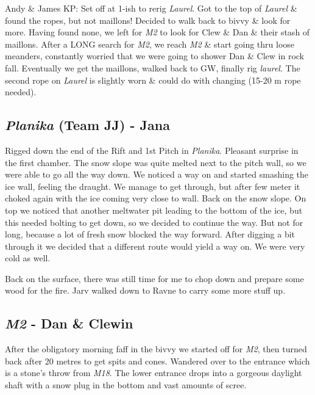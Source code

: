 Andy \& James KP: Set off at 1-ish to rerig \emph{Laurel}. Got to the
top of \emph{Laurel} \& found the ropes, but not maillons! Decided to
walk back to bivvy \& look for more. Having found none, we left for
\emph{M2} to look for Clew \& Dan \& their stash of maillons. After a
LONG search for \emph{M2}, we reach \emph{M2} \& start going thru loose
meanders, constantly worried that we were going to shower Dan \& Clew in
rock fall. Eventually we get the maillons, walked back to GW, finally
rig \emph{laurel}. The second rope on \emph{Laurel} is slightly worn \&
could do with changing (15-20 m rope needed).

\hypertarget{planika-team-jj---jana}{%
\subsection{\texorpdfstring{\emph{Planika} (Team JJ) -
Jana}{Planika (Team JJ) - Jana}}\label{planika-team-jj---jana}}

Rigged down the end of the Rift and 1st Pitch in \emph{Planika}.
Pleasant surprise in the first chamber. The snow slope was quite melted
next to the pitch wall, so we were able to go all the way down. We
noticed a way on and started smashing the ice wall, feeling the draught.
We manage to get through, but after few meter it choked again with the
ice coming very close to wall. Back on the snow slope. On top we noticed
that another meltwater pit leading to the bottom of the ice, but this
needed bolting to get down, so we decided to continue the way. But not
for long, because a lot of fresh snow blocked the way forward. After
digging a bit through it we decided that a different route would yield a
way on. We were very cold as well.

Back on the surface, there was still time for me to chop down and
prepare some wood for the fire. Jarv walked down to Ravne to carry some
more stuff up.

\hypertarget{m2---dan-clewin}{%
\subsection{\texorpdfstring{\emph{M2} - Dan \&
Clewin}{M2 - Dan \& Clewin}}\label{m2---dan-clewin}}

After the obligatory morning faff in the bivvy we started off for
\emph{M2}, then turned back after 20 metres to get spits and cones.
Wandered over to the entrance which is a stone's throw from \emph{M18}.
The lower entrance drops into a gorgeous daylight shaft with a snow plug
in the bottom and vast amounts of scree.


